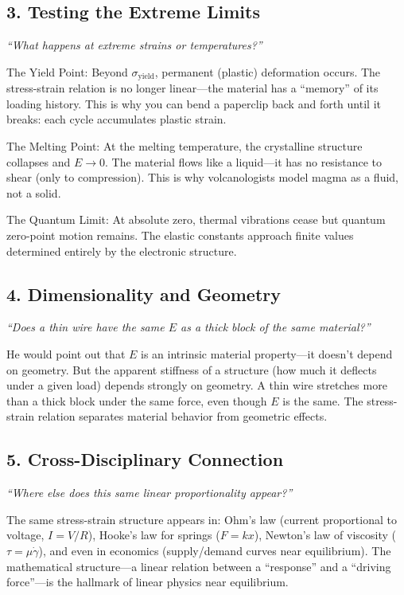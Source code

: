 \documentclass[11pt,openright]{book}
\begin{document}
\subsection*{3. Testing the Extreme Limits}
\textit{``What happens at extreme strains or temperatures?''}

The Yield Point: Beyond $\sigma_{\text{yield}}$, permanent (plastic) deformation occurs. The stress-strain relation is no longer linear---the material has a ``memory'' of its loading history. This is why you can bend a paperclip back and forth until it breaks: each cycle accumulates plastic strain.

The Melting Point: At the melting temperature, the crystalline structure collapses and $E \to 0$. The material flows like a liquid---it has no resistance to shear (only to compression). This is why volcanologists model magma as a fluid, not a solid.

The Quantum Limit: At absolute zero, thermal vibrations cease but quantum zero-point motion remains. The elastic constants approach finite values determined entirely by the electronic structure.

\subsection*{4. Dimensionality and Geometry}
\textit{``Does a thin wire have the same $E$ as a thick block of the same material?''}

He would point out that $E$ is an intrinsic material property---it doesn't depend on geometry. But the apparent stiffness of a structure (how much it deflects under a given load) depends strongly on geometry. A thin wire stretches more than a thick block under the same force, even though $E$ is the same. The stress-strain relation separates material behavior from geometric effects.

\subsection*{5. Cross-Disciplinary Connection}
\textit{``Where else does this same linear proportionality appear?''}

The same stress-strain structure appears in: Ohm's law (current proportional to voltage, $I = V/R$), Hooke's law for springs ($F = kx$), Newton's law of viscosity ($\tau = \mu \dot{\gamma}$), and even in economics (supply/demand curves near equilibrium). The mathematical structure---a linear relation between a ``response'' and a ``driving force''---is the hallmark of linear physics near equilibrium.
\end{document}
